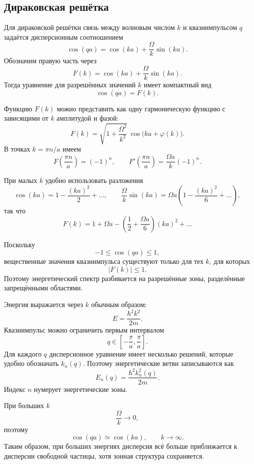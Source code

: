 \documentclass[12pt,a4paper]{article}
\begin{document}
\subsection{Дираковская решётка}

Для дираковской решётки связь между волновым числом $k$ и
квазиимпульсом $q$ задаётся дисперсионным соотношением
\[
    \boxed{
        \cos(qa)
        =
        \cos(ka)+\frac{\Omega}{k}\sin(ka)
    }.
\]
Обозначим правую часть через
\[
    F(k)
    =
    \cos(ka)+\frac{\Omega}{k}\sin(ka).
\]
Тогда уравнение для разрешённых значений $k$ имеет компактный вид
\[
    \cos(qa)=F(k).
\]

Функцию $F(k)$ можно представить как одну гармоническую функцию с
зависящими от $k$ амплитудой и фазой:
\[
    F(k)
    =
    \sqrt{1+\frac{\Omega^2}{k^2}}\,
    \cos\bigl(ka+\varphi(k)\bigr).
\]
В точках $k=\pi n/a$ имеем
\[
    F\left(\frac{\pi n}{a}\right)=(-1)^n,
    \qquad
    F'\left(\frac{\pi n}{a}\right)
    =
    \frac{\Omega a}{k}(-1)^n.
\]

При малых $k$ удобно использовать разложения
\[
    \cos(ka)
    =
    1-\frac{(ka)^2}{2}+\ldots,
    \qquad
    \frac{\Omega}{k}\sin(ka)
    =
    \Omega a
    \left(
        1-\frac{(ka)^2}{6}+\ldots
    \right),
\]
так что
\[
    F(k)
    =
    1+\Omega a
    -
    \left(
        \frac12+\frac{\Omega a}{6}
    \right)(ka)^2
    +\ldots
\]

Поскольку
\[
    -1\leq \cos(qa)\leq1,
\]
вещественные значения квазиимпульса существуют только для тех $k$,
для которых
\[
    \boxed{|F(k)|\leq1}.
\]
Поэтому энергетический спектр разбивается на разрешённые зоны,
разделённые запрещёнными областями.

Энергия выражается через $k$ обычным образом:
\[
    \boxed{
        E=\frac{\hbar^2k^2}{2m}
    }.
\]
Квазиимпульс можно ограничить первым интервалом
\[
    \boxed{
        q\in
        \left[
            -\frac{\pi}{a},
            \frac{\pi}{a}
        \right]
    }.
\]
Для каждого $q$ дисперсионное уравнение имеет несколько решений,
которые удобно обозначать $k_n(q)$. Поэтому энергетические ветви
записываются как
\[
    E_n(q)
    =
    \frac{\hbar^2k_n^2(q)}{2m}.
\]
Индекс $n$ нумерует энергетические зоны.

При больших $k$
\[
    \frac{\Omega}{k}\longrightarrow0,
\]
поэтому
\[
    \boxed{
        \cos(qa)\simeq\cos(ka),
        \qquad k\to\infty
    }.
\]
Таким образом, при больших энергиях дисперсия всё больше приближается
к дисперсии свободной частицы, хотя зонная структура сохраняется.
\end{document}
